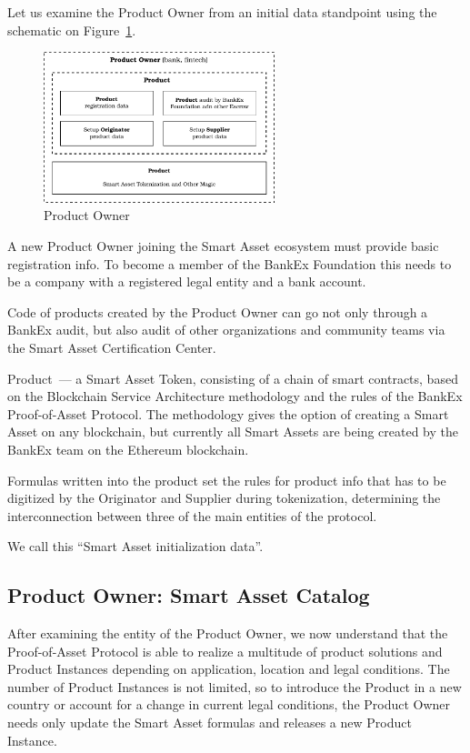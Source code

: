 \documentclass{article}
\begin{document}
\begin{multicols}{2}
Let us examine the Product Owner from an initial data standpoint using the schematic on Figure~\ref{fig:product-owner}.

\begin{figure}
  \centering
  \includegraphics[width=0.6\textwidth]{product-owner.pdf}
  \caption{Product Owner}
  \label{fig:product-owner}
\end{figure}

A new Product Owner joining the Smart Asset ecosystem must provide basic registration info. To become a member of the BankEx Foundation this needs to be a company with a registered legal entity and a bank account.

Code of products created by the Product Owner can go not only through a BankEx audit, but also audit of other organizations and community teams via the Smart Asset Certification Center.

Product~--- a Smart Asset Token, consisting of a chain of smart contracts, based on the Blockchain Service Architecture methodology and the rules of the BankEx Proof-of-Asset Protocol. The methodology gives the option of creating a Smart Asset on any blockchain, but currently all Smart Assets are being created by the BankEx team on the Ethereum blockchain. 

Formulas written into the product set the rules for product info that has to be digitized by the Originator and Supplier during tokenization, determining the interconnection between three of the main entities of the protocol.

We call this \enquote{Smart Asset initialization data}.

\subsection{Product Owner: Smart Asset Catalog}

After examining the entity of the Product Owner, we now understand that the Proof-of-Asset Protocol is able to realize a multitude of product solutions and Product Instances depending on application, location and legal conditions. The number of Product Instances is not limited, so to introduce the Product in a new country or account for a change in current legal conditions, the Product Owner needs only update the Smart Asset formulas and releases a new Product Instance. 


\end{multicols}
\end{document}
